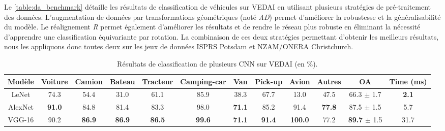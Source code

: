 Le \cref{table:da_benchmark} détaille les résultats de classification de véhicules sur \gls{VEDAI} en utilisant plusieurs stratégies de pré-traitement des données. L'augmentation de données par transformations géométriques (noté \emph{AD}) permet d'améliorer la robustesse et la généralisabilité du modèle. Le réalignement \emph{R} permet également d'améliorer les résultats et de rendre le réseau plus robuste en éliminant la nécessité d'apprendre une classification équivariante par rotation. La combinaison de ces deux stratégies permettant d'obtenir les meilleurs résultats, nous les appliquons donc toutes deux sur les jeux de données \gls{ISPRS} Potsdam et NZAM/ONERA Christchurch.

\begin{table}[t]
\centering
	\caption{Résultats de classification de plusieurs \gls{CNN} sur \gls{VEDAI} (en \%).}
    \label{table:cnn_benchmark}
    \setlength\tabcolsep{3pt}
	\begin{tabular}{cccccccccccc}
    \toprule
    \textbf{Modèle} &  \textbf{Voiture} & \textbf{Camion} & \textbf{Bateau} & \textbf{Tracteur} & \textbf{Camping-car} & \textbf{Van} & \textbf{Pick-up} & \textbf{Avion} & \textbf{Autres} & \textbf{OA} & \textbf{Time (ms)}\\
    \midrule
  LeNet & 74.3 & 54.4 & 31.0 & 61.1 & 85.9 & 38.3 & 67.7 & 13.0 & 47.5 & 66.3 $\pm$ 1.7  & \textbf{2.1}\\
  AlexNet & \textbf{91.0} & 84.8 & 81.4 & 83.3 & 98.0 & \textbf{71.1} & 85.2 & 91.4 & \textbf{77.8} & 87.5 $\pm$ 1.5 & 5.7\\
  VGG-16 & 90.2 & \textbf{86.9} & \textbf{86.9} & \textbf{86.5} & \textbf{99.6} & \textbf{71.1}
& \textbf{91.4} & \textbf{100.0} & 77.2 & \textbf{89.7} $\pm$ 1.5 & 31.7\\
    \bottomrule
    \end{tabular}
\end{table}
\unskip
